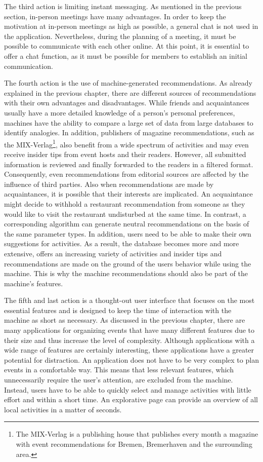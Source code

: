 \documentclass[12pt,numbers=noenddot,parskip,bibliography=totocnumbered,listof=totocnumbered]{scrreprt}
\begin{document}
The third action is limiting instant messaging. As mentioned in the previous section, in-person meetings have many advantages. In order to keep the motivation at in-person meetings as high as possible, a general chat is not used in the application. Nevertheless, during the planning of a meeting, it must be possible to communicate with each other online. At this point, it is essential to offer a chat function, as it must be possible for members to establish an initial communication.

The fourth action is the use of machine-generated recommendations. As already explained in the previous chapter, there are different sources of recommendations with their own advantages and disadvantages. While friends and acquaintances usually have a more detailed knowledge of a person's personal preferences, machines have the ability to compare a large set of data from large databases to identify analogies. In addition, publishers of magazine recommendations, such as the MIX-Verlag\footnote{The MIX-Verlag is a publishing house that publishes every month a magazine with event recommendations for Bremen, Bremerhaven and the surrounding area.}, also benefit from a wide spectrum of activities and may even receive insider tips from event hosts and their readers. However, all submitted information is reviewed and finally forwarded to the readers in a filtered format. Consequently, even recommendations from editorial sources are affected by the influence of third parties. Also when recommendations are made by acquaintances, it is possible that their interests are implicated. An acquaintance might decide to withhold a restaurant recommendation from someone as they would like to visit the restaurant undisturbed at the same time.\newline
In contrast, a corresponding algorithm can generate neutral recommendations on the basis of the same parameter types. In addition, users need to be able to make their own suggestions for activities. As a result, the database becomes more and more extensive, offers an increasing variety of activities and insider tips and recommendations are made on the ground of the users behavior while using the machine. This is why the machine recommendations should also be part of the machine's features.

The fifth and last action is a thought-out user interface that focuses on the most essential features and is designed to keep the time of interaction with the machine as short as necessary. As discussed in the previous chapter, there are many applications for organizing events that have many different features due to their size and thus increase the level of complexity. Although applications with a wide range of features are certainly interesting, these applications have a greater potential for distraction. An application does not have to be very complex to plan events in a comfortable way. \newline
This means that less relevant features, which unnecessarily require the user's attention, are excluded from the machine. Instead, users have to be able to quickly select and manage activities with little effort and within a short time. An explorative page can provide an overview of all local activities in a matter of seconds.
\end{document}
